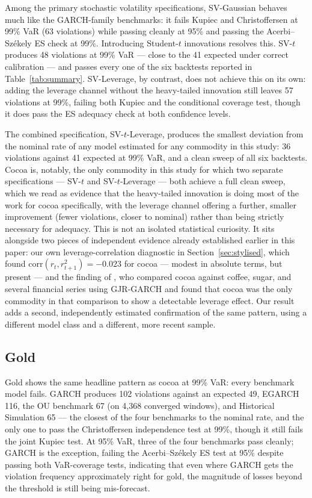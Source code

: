 \documentclass[preprint,12pt,authoryear]{elsarticle}
\begin{document}
Among the primary stochastic volatility specifications, SV-Gaussian behaves much like the GARCH-family benchmarks: it fails Kupiec and Christoffersen at 99\% VaR (63 violations) while passing cleanly at 95\% and passing the Acerbi--Sz\'ekely ES check at 99\%. Introducing Student-$t$ innovations resolves this. SV-$t$ produces 48 violations at 99\% VaR --- close to the 41 expected under correct calibration --- and passes every one of the six backtests reported in Table~\ref{tab:summary}. SV-Leverage, by contrast, does not achieve this on its own: adding the leverage channel without the heavy-tailed innovation still leaves 57 violations at 99\%, failing both Kupiec and the conditional coverage test, though it does pass the ES adequacy check at both confidence levels.

The combined specification, SV-$t$-Leverage, produces the smallest deviation from the nominal rate of any model estimated for any commodity in this study: 36 violations against 41 expected at 99\% VaR, and a clean sweep of all six backtests. Cocoa is, notably, the only commodity in this study for which two separate specifications --- SV-$t$ and SV-$t$-Leverage --- both achieve a full clean sweep, which we read as evidence that the heavy-tailed innovation is doing most of the work for cocoa specifically, with the leverage channel offering a further, smaller improvement (fewer violations, closer to nominal) rather than being strictly necessary for adequacy. This is not an isolated statistical curiosity. It sits alongside two pieces of independent evidence already established earlier in this paper: our own leverage-correlation diagnostic in Section~\ref{sec:stylised}, which found $\text{corr}(r_t, r_{t+1}^2) = -0.023$ for cocoa --- modest in absolute terms, but present --- and the finding of \citet{roux2018}, who compared cocoa against coffee, sugar, and several financial series using GJR-GARCH and found that cocoa was the only commodity in that comparison to show a detectable leverage effect. Our result adds a second, independently estimated confirmation of the same pattern, using a different model class and a different, more recent sample.

\subsection{Gold}
\label{sec:results_gold}

Gold shows the same headline pattern as cocoa at 99\% VaR: every benchmark model fails. GARCH produces 102 violations against an expected 49, EGARCH 116, the OU benchmark 67 (on 4,368 converged windows), and Historical Simulation 65 --- the closest of the four benchmarks to the nominal rate, and the only one to pass the Christoffersen independence test at 99\%, though it still fails the joint Kupiec test. At 95\% VaR, three of the four benchmarks pass cleanly; GARCH is the exception, failing the Acerbi--Sz\'ekely ES test at 95\% despite passing both VaR-coverage tests, indicating that even where GARCH gets the violation frequency approximately right for gold, the magnitude of losses beyond the threshold is still being mis-forecast.
\end{document}
